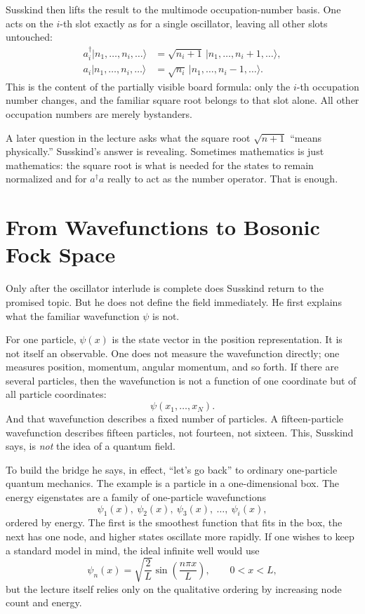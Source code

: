 Susskind then lifts the result to the multimode occupation-number basis. One acts on the \(i\)-th slot exactly as for a single oscillator, leaving all other slots untouched:
\begin{align}
a_i^\dagger|n_1,\ldots,n_i,\ldots\rangle
&=
\sqrt{n_i+1}\,|n_1,\ldots,n_i+1,\ldots\rangle, \\
a_i|n_1,\ldots,n_i,\ldots\rangle
&=
\sqrt{n_i}\,|n_1,\ldots,n_i-1,\ldots\rangle.
\end{align}
This is the content of the partially visible board formula: only the \(i\)-th occupation number changes, and the familiar square root belongs to that slot alone. All other occupation numbers are merely bystanders.

A later question in the lecture asks what the square root \(\sqrt{n+1}\) ``means physically.'' Susskind's answer is revealing. Sometimes mathematics is just mathematics: the square root is what is needed for the states to remain normalized and for \(a^\dagger a\) really to act as the number operator. That is enough.

\section{From Wavefunctions to Bosonic Fock Space}

Only after the oscillator interlude is complete does Susskind return to the promised topic. But he does not define the field immediately. He first explains what the familiar wavefunction \(\psi\) is not.

For one particle, \(\psi(x)\) is the state vector in the position representation. It is not itself an observable. One does not measure the wavefunction directly; one measures position, momentum, angular momentum, and so forth. If there are several particles, then the wavefunction is not a function of one coordinate but of all particle coordinates:
\begin{equation}
\psi(x_1,\ldots,x_N).
\end{equation}
And that wavefunction describes a fixed number of particles. A fifteen-particle wavefunction describes fifteen particles, not fourteen, not sixteen. This, Susskind says, is \emph{not} the idea of a quantum field.

To build the bridge he says, in effect, ``let's go back'' to ordinary one-particle quantum mechanics. The example is a particle in a one-dimensional box. The energy eigenstates are a family of one-particle wavefunctions
\begin{equation}
\psi_1(x),\ \psi_2(x),\ \psi_3(x),\ \ldots,\ \psi_i(x),
\end{equation}
ordered by energy. The first is the smoothest function that fits in the box, the next has one node, and higher states oscillate more rapidly. If one wishes to keep a standard model in mind, the ideal infinite well would use
\begin{equation}
\psi_n(x)=\sqrt{\frac{2}{L}}\sin\!\left(\frac{n\pi x}{L}\right),
\qquad 0<x<L,
\end{equation}
but the lecture itself relies only on the qualitative ordering by increasing node count and energy.

